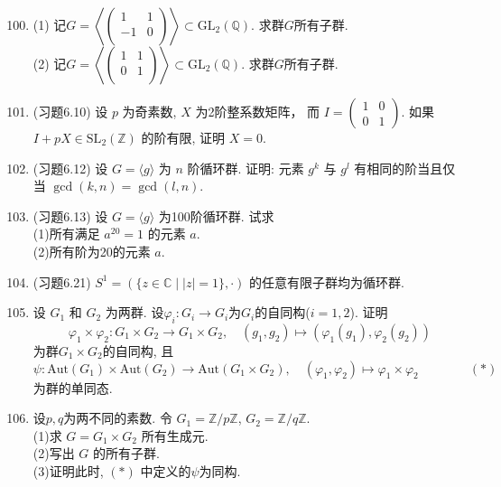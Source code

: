 \documentclass[a4paper,12pt]{article}
\begin{document}
\begin{enumerate}\setcounter{enumi}{99}

    \item (1) 记$G=\left\langle\begin{pmatrix} 1&1\\-1&0\\\end{pmatrix}\right\rangle\subset \mathrm{GL}_2(\mathbb Q)$. 求群$G$所有子群.\\
          (2) 记$G=\left\langle\begin{pmatrix} 1&1\\0&1\\\end{pmatrix}\right\rangle\subset \mathrm{GL}_2(\mathbb Q)$. 求群$G$所有子群.

    \item (习题6.10) 设 $p$ 为奇素数, $X$ 为2阶整系数矩阵， 而 $I=\begin{pmatrix}
        1 & 0\\
        0 & 1
    \end{pmatrix}$. 如果 $I+pX\in \text{SL}_2(\mathbb{Z})$ 的阶有限, 证明 $X=0$.

    \item (习题6.12) 设 $G=\langle g\rangle$ 为 $n$ 阶循环群. 证明: 元素 $g^k$ 与 $g^l$ 有相同的阶当且仅当 $\gcd(k,n)=\gcd(l,n)$. 
    \item (习题6.13) 设 $G=\langle g \rangle$ 为100阶循环群. 试求\\
    (1)\quad 所有满足 $a^{20}=1$ 的元素 $a$. \\
    (2)\quad 所有阶为20的元素 $a$. 
    \item (习题6.21) $S^1=(\{z\in \mathbb{C}\mid |z|=1\},\cdot)$ 的任意有限子群均为循环群.

    \item 设 $G_1$ 和 $G_2$ 为两群. 设$\varphi_i\colon G_i\rightarrow G_i$为$G_i$的自同构($i=1,2$).  证明
    \[\varphi_1\times\varphi_2 \colon G_1\times G_2 \rightarrow G_1\times G_2, \quad (g_1,g_2)\mapsto (\varphi_1(g_1),\varphi_2(g_2))\]
    为群$G_1\times G_2$的自同构, 且 
    \begin{equation*} 
        \psi\colon \mathrm{Aut}(G_1)\times\mathrm{Aut}(G_2) \rightarrow \mathrm{Aut}(G_1\times G_2), \quad (\varphi_1,\varphi_2)\mapsto \varphi_1\times\varphi_2 \qquad \qquad (*)
    \end{equation*}
    为群的单同态.  
    \item 设$p,q$为两不同的素数. 令 $G_1=\mathbb{Z}/p\mathbb{Z}$, $G_2=\mathbb{Z}/q\mathbb{Z}$. \\
    (1)\quad 求 $G=G_1\times G_2$ 所有生成元.\\
    (2)\quad 写出 $G$ 的所有子群.\\
    (3)\quad 证明此时, $(*)$ 中定义的$\psi$为同构.
   


\end{enumerate}
\end{document}
